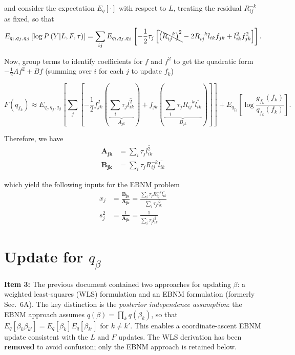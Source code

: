 \documentclass{article}[12pt]
\begin{document}
and consider the expectation $E_{q}\left[\cdot\right]$ with respect to $L$, treating the residual $R^{-k}_{ij}$ as fixed, so that
\begin{equation}
    E_{q_l, q_f, q_{\beta}}\left[\log P\left(Y \vert L, F, \tau\right)\right] = \sum_{ij}E_{q_l, q_f, q_{\beta}}\left[-\frac{1}{2}\tau_{j}\left[\bcancel{\left(R^{-k}_{ij}\right)^2}-2R^{-k}_{ij}l_{ik}f_{jk}+l^{2}_{ik}f^{2}_{jk}\right]\right].
\end{equation}

Now, group terms to identify coefficients for $f$ and $f^2$ to get the quadratic form $-\frac{1}{2}Af^2+Bf$ (summing over $i$ for each $j$ to update $f_k$)

\begin{equation}
    F\left(q_{f_k}\right) \approx E_{q_l, q_f, q_{\beta}}\left[\sum_{j}\left[-\frac{1}{2}f^{2}_{jk}\left(\underbrace{\sum_{i}\tau_{j}\overline{l^{2}_{ik}}}_{A_{jk}}\right)+f_{jk}\left(\underbrace{\sum_{i}\tau_{j}R^{-k}_{ij}\overline{l_{ik}}}_{B_{jk}}\right)\right]\right]+E_{q_{f_k}}\left[\log \frac{g_{f_k}(f_k)}{q_{f_k}(f_k)}\right].
\end{equation}

Therefore, we have
\begin{align}
    \mathbf{A_{jk}} &= \sum_{i}\tau_{j}\overline{l^{2}_{ik}}\label{eq:A-F}\\
    \mathbf{B_{jk}} &= \sum_{i} \tau_{j}R^{-k}_{ij}\overline{l_{ik}}\label{eq:B-F}
\end{align}

which yield the following inputs for the EBNM problem
\begin{align}
    x_j &= \frac{\mathbf{B_{jk}}}{\mathbf{A_{jk}}} = \frac{\sum_{i} \tau_{j}R^{-k}_{ij}\overline{l_{ik}}}{\sum_{i}\tau_{j}\overline{l^{2}_{ik}}}\label{eq:xj-F}\\
    s^{2}_{j} &= \frac{1}{\mathbf{A_{jk}}} = \frac{1}{\sum_{i}\tau_{j}\overline{l^{2}_{ik}}}\label{eq:sj-F}
\end{align}
\section{Update for $q_{\beta}$}

\begin{corrbox}
\textbf{Item 3:} The previous document contained two approaches for updating $\beta$:
a weighted least-squares (WLS) formulation and an EBNM formulation (formerly
Sec.~6A). The key distinction is the \emph{posterior independence assumption}:
the EBNM approach assumes $q(\beta) = \prod_k q(\beta_k)$, so that
$E_q[\beta_k\beta_{k'}] = E_q[\beta_k]E_q[\beta_{k'}]$ for $k\neq k'$.
This enables a coordinate-ascent EBNM update consistent with the $L$ and $F$
updates. The WLS derivation has been \textbf{removed} to avoid confusion;
only the EBNM approach is retained below.
\end{corrbox}
\end{document}
